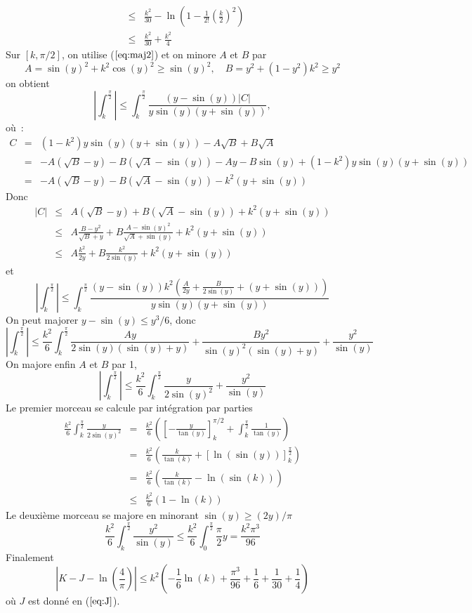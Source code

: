 \documentclass[a4paper,11pt]{article}
\begin{document}
\begin{giacjshere}
\begin{eqnarray*}
&\leq & \frac{k^2}{30}-  \ln (1- \frac{1}{2!}\left(\frac{k}{2}\right)^2) \\
&\leq &  \frac{k^2}{30} +\frac{k^2}{4}
\end{eqnarray*}
Sur $[k,\pi/2]$, on utilise (\(\ref{eq:maj2}\))
et on minore $A$ et $B$ par
\[ A=\sin(y)^2+k^2 \cos(y)^2 \geq \sin(y)^2, \quad B=y^2+(1-y^2)k^2 \geq y^2\]
on obtient
\[ 
| \int_k^{\frac{\pi}{2}} | \leq  \int_k^{\frac{\pi}{2}}
\frac{(y-\sin(y))|C|}
{y \sin(y) (y+\sin(y))} , 
\]
où~:
\begin{eqnarray*}
C&=&(1-k^2)y \sin(y)(y+\sin(y))-A\sqrt{B}+B\sqrt{A} \\
&=& -A(\sqrt{B}-y)-B(\sqrt{A}-\sin(y))
-Ay-B\sin(y) + (1-k^2)y \sin(y)(y+\sin(y)) \\
&=& -A(\sqrt{B}-y)-B(\sqrt{A}-\sin(y)) - k^2(y+\sin(y))
\end{eqnarray*}
Donc
\begin{eqnarray*}
 |C| &\leq& A(\sqrt{B}-y)+B(\sqrt{A}-\sin(y)) + k^2(y+\sin(y)) \\
&\leq& A \frac{B-y^2}{\sqrt{B}+y}
+ B \frac{A-\sin(y)^2}{\sqrt{A}+\sin(y)} + k^2(y+\sin(y)) \\
&\leq & A \frac{k^2}{2y} + B \frac{k^2}{2\sin(y)} + k^2(y+\sin(y))
\end{eqnarray*}
et
\[ 
| \int_k^{\frac{\pi}{2}} | \leq 
\int_k^{\frac{\pi}{2} }
\frac{(y-\sin(y))k^2(\frac{A}{2y} + \frac{B}{2\sin(y)} + (y+\sin(y))) }
{y \sin(y) (y+\sin(y))}
\]
On peut majorer $y-\sin(y) \leq y^3/6$, donc
\[ 
| \int_k^{\frac{\pi}{2}} | \leq 
\frac{k^2}{6} \int_k^{\frac{\pi}{2}}
 \frac{Ay}{2\sin(y) (\sin(y)+y)} + \frac{By^2}{\sin(y)^2(\sin(y)+y)} + \frac{y^2}{\sin(y)}
\]
On majore enfin $A$ et $B$ par 1, 
\[ | \int_k^{\frac{\pi}{2}} |
\leq \frac{k^2}{6} \int_k^{\frac{\pi}{2}}
\frac{y}{2\sin(y)^2} + \frac{y^2}{\sin(y)}
\]
Le premier morceau se calcule par intégration par parties
\begin{eqnarray*}
\frac{k^2}{6} \int_k^{\frac{\pi}{2}}
\frac{y}{2\sin(y)^2}
&=&
\frac{k^2}{6} \left( [-\frac{y}{\tan(y)}]_k^{\pi/2} 
+ \int_k^{\frac{\pi}{2}} \frac{1}{\tan(y)}
\right) \\
&=& \frac{k^2}{6} \left(\frac{k}{\tan(k)}+ [\ln(\sin(y))]_k^{\frac{\pi}{2}} \right)\\
&=& \frac{k^2}{6} \left(\frac{k}{\tan(k)}-\ln(\sin(k)) \right)\\
&\leq &  \frac{k^2}{6}(1-\ln(k))
\end{eqnarray*}
Le deuxième morceau se majore en minorant $\sin(y)\geq (2y)/\pi$
\[ 
\frac{k^2}{6} \int_k^{\frac{\pi}{2}} \frac{y^2}{\sin(y)}
\leq \frac{k^2}{6} \int_0^{\frac{\pi}{2}} \frac{\pi}{2} y
= \frac{k^2\pi^3}{96} 
\]
Finalement
\[ |K-J-\ln(\frac{4}{\pi})| 
\leq k^2 \left( -\frac{1}{6} \ln(k) + \frac{\pi^3}{96} + \frac{1}{6} + \frac{1}{30}+ 
\frac{1}{4} \right)
\]
où $J$ est donné en (\(\ref{eq:J}\)).


\end{giacjshere}
\end{document}
